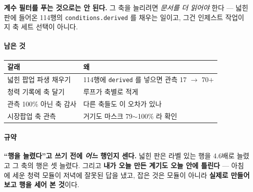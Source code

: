 \documentclass[10pt]{article}
\begin{document}
\textbf{계수 필터를 푸는 것으로는 안 된다.} 그 축을 늘리려면 \emph{문서를
더 읽어야} 한다 --- 넓힌 판에 들어온 114행의 \texttt{conditions.derived}
를 채우는 일이고, 그건 인제스트 작업이지 축 세트 선택이 아니다.

\paragraph{남은 것}
\begin{center}\small
\begin{tabular}{ll}
\hline
갈래 & 왜 \\
\hline
넓힌 팝업 파생 채우기 & 114행에 \texttt{derived} 를 넣으면 관측 17 $\to$ 70$+$ \\
청력 기록에 축 달기 & 루프가 축별로 적게 \\
관측 100\% 아닌 축 감사 & 다른 축들도 이 오차가 있나 \\
시장팝업 축 관측 & 거기도 마스크 79$\sim$100\% 라 확인 \\
\hline
\end{tabular}
\end{center}

\paragraph{규약} \textbf{``행을 늘렸다''고 쓰기 전에 \emph{어느} 행인지 센다.}
넓힌 판은 라벨 있는 행을 4.6배로 늘렸고 그 축의 행은 셋 늘렸다. 그리고
\textbf{내가 오늘 만든 계기도 오늘 안에 틀린다} --- 아침에 세운 청력 모듈이
저녁에 잘못된 답을 냈고, 잡은 것은 모듈이 아니라 \textbf{실제로 만들어 보고
행을 세어 본 것}이다.
\end{document}
